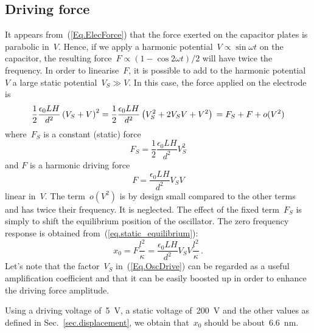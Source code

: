 \subsection{Driving force}
\label{sec.drive}
It appears from~(\ref{Eq.ElecForce}) that the force exerted on the capacitor plates is parabolic in~$V$. Hence, if we apply a harmonic potential~$V\propto \sin\omega t$ on the capacitor, the resulting force~$F\propto (1-\cos2\omega t)/2$ will have twice the frequency. In order to linearise~$F$, it is possible to add to the harmonic potential~$V$ a large static potential~$V_S \gg V$. In this case, the force applied on the electrode is
\begin{equation}
\frac{1}{2} \frac{\epsilon_0 L H}{d^2}
\left(V_S + V\right)^2 =
\frac{1}{2} \frac{\epsilon_0 L H}{d^2}
\left(V_S^2 + 2 V_S V + V^2\right) \\
= F_S + F + o(V^2) 
\end{equation}
where~$F_S$ is a constant (static) force
\begin{equation}
F_S = \frac{1}{2} \frac{\epsilon_0 L H}{d^2}V_S^2
\end{equation}
and $F$ is a harmonic driving force
\begin{equation}
F = \frac{\epsilon_0 L H}{d^2}V_S V
\label{Eq.OscDrive}
\end{equation}
linear in~$V$. The term~$o(V^2)$ is by design small compared to the other terms and has twice their frequency. It is neglected. The effect of the fixed term~$F_S$ is simply to shift the equilibrium position of the oscillator. The zero frequency response is obtained from~(\ref{eq.static_equilibrium}):
\begin{equation}
\label{eq.static}
x_0 = F \frac{l^2}{\kappa} = \frac{\epsilon_0 L H}{d^2} V_S V \frac{l^2}{\kappa} \,.
\end{equation}
Let's note that the factor~$V_S$ in~(\ref{Eq.OscDrive}) can be regarded as a useful amplification coefficient and that it can be easily boosted up in order to enhance the driving force amplitude.

Using a driving voltage of~\si{\num{5}\volt}, a static voltage of~\si{\num{200}\volt} and the other values as defined in Sec.~\ref{sec.displacement}, we obtain that~$x_0$ should be about~\si{\num{6.6}\nano\meter}.

